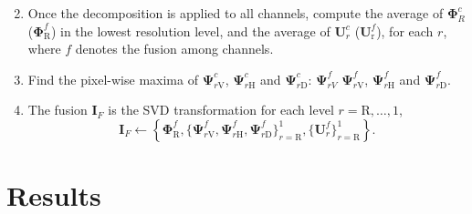 \documentclass[journal]{IEEEtran}
\begin{document}
\begin{enumerate}
\begin{equation}
\end{equation}
\item Once the decomposition is applied to all channels, 
compute the average of $\bm\Phi_R^c$ ($\bm\Phi_\text{R}^f$) in the lowest resolution level, and the average 
of $\bm U_r^c$ ($\bm U_\text{r}^f$), for each $r$, where $f$ denotes the fusion among channels. 
\item Find the pixel-wise maxima of $\bm\Psi_{r\text{V}}^c$, $\bm\Psi_{r\text{H}}^c$ and $\bm\Psi_{r\text{D}}^c$: $ \bm\Psi_{rV}^f$ $\bm\Psi_{r\text{V}}^f$, $\bm\Psi_{r\text{H}}^f$ and $\bm\Psi_{r\text{D}}^f$.
\item The fusion $\bm I_F$ is the SVD transformation for each level $r=\text{R},\dots,1$,  
\begin{equation}\nonumber
\bm I_F\leftarrow \left\{\bm \Phi_\text{R}^f,\{\bm\Psi_{r\text{V}}^f,\bm\Psi_{r\text{H}}^f,\bm\Psi_{r\text{D}}^f \}_{r=\text{R}}^1,\{\bm U_r^f\}_{r=\text{R}}^1 \right\}.
\end{equation}
\end{enumerate}

\section{Results}
\end{document}
